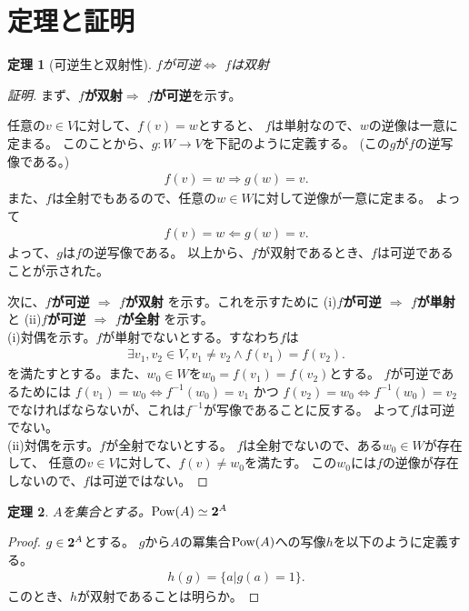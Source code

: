 \documentclass{jsarticle}
\newtheorem{Theorem}{定理}
\newcommand{\Pow}{ {\rm Pow} }
\newcommand{\2}{ {\bf 2} }
\begin{document}
\section{定理と証明}
\begin{Theorem}[可逆生と双射性]
    $f$が可逆$\Leftrightarrow$ $f$は双射
\end{Theorem}
\begin{proof}[証明]
    まず、{\bf $f$が双射$\Rightarrow$ $f$が可逆}を示す。
    
    任意の$v\in V$に対して、$f(v)=w$とすると、
    $f$は単射なので、$w$の逆像は一意に定まる。
    このことから、$g:W \rightarrow V$を下記のように定義する。
    (この$g$が$f$の逆写像である。)
    \begin{align*}
        f(v)=w \Rightarrow g(w)=v.
    \end{align*}
    また、$f$は全射でもあるので、任意の$w \in W$に対して逆像が一意に定まる。
    よって
    \begin{align*}
        f(v)=w \Leftarrow g(w)=v.
    \end{align*}
    よって、$g$は$f$の逆写像である。
    以上から、$f$が双射であるとき、$f$は可逆であることが示された。

    次に、{\bf $f$が可逆 $\Rightarrow$ $f$が双射}
    を示す。これを示すために
    (i){\bf $f$が可逆 $\Rightarrow$ $f$が単射}
    と
    (ii){\bf $f$が可逆 $\Rightarrow$ $f$が全射}
    を示す。\\
    (i)対偶を示す。$f$が単射でないとする。すなわち$f$は
    \begin{align*}
        \exists v_1, v_2 \in V, v_1 \neq v_2 \land f(v_1)=f(v_2).
    \end{align*}
    を満たすとする。また、$w_0 \in W$を$w_0 = f(v_1)=f(v_2)$とする。
    $f$が可逆であるためには
    $f(v_1)=w_0 \Leftrightarrow f^{-1}(w_0)=v_1$ 
    かつ $f(v_2)=w_0 \Leftrightarrow f^{-1}(w_0)=v_2$
    でなければならないが、これは$f^{-1}$が写像であることに反する。
    よって$f$は可逆でない。\\
    (ii)対偶を示す。$f$が全射でないとする。
    $f$は全射でないので、ある$w_0 \in W$が存在して、
    任意の$v \in V$に対して、$f(v) \neq w_0$を満たす。
    この$w_0$には$f$の逆像が存在しないので、$f$は可逆ではない。
\end{proof}

\begin{Theorem}
    $A$を集合とする。$\Pow(A) \simeq {\2}^A$
\end{Theorem}
\begin{proof}
    $g \in {\2}^A$とする。
    $g$から$A$の冪集合$\Pow(A)$への写像$h$を以下のように定義する。
    \begin{align*}
        h(g) = \{ a | g(a)=1 \}.
    \end{align*}
    このとき、$h$が双射であることは明らか。
\end{proof}
\end{document}
